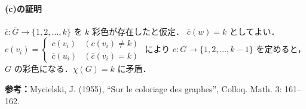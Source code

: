 \paragraph{(c)の証明}
$\overline{c}\colon \overline{G}\longrightarrow \{1,2,\ldots,k\}$ を $k$ 彩色が存在したと仮定．
$\overline{c}(w) = k$ としてよい．
$c(v_i) = \begin{cases}\overline{c}(v_i) & (\overline{c}(v_i)\neq k)\\ \overline{c}(u_i) & (\overline{c}(v_i) = k)\end{cases}$ により
$c\colon G\longrightarrow \{1,2,\ldots,k-1\}$ を定めると，$G$ の彩色になる．$\chi(G) = k$ に矛盾．


\noindent\textbf{参考：}Mycielski, J. (1955), “Sur le coloriage des graphes”, Colloq. Math. 3: 161–162. 